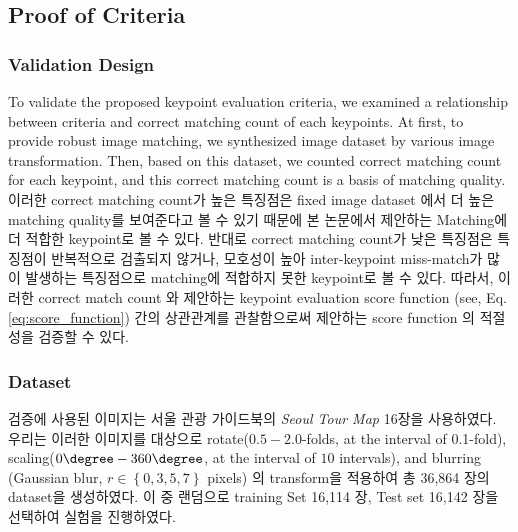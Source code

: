 
\subsection{Proof of Criteria}
\subsubsection{Validation Design}
To validate the proposed keypoint evaluation criteria, we examined a relationship between criteria and correct matching count of each keypoints. At first, to provide robust image matching, we synthesized image dataset by various image transformation. Then, based on this dataset, we counted correct matching count for each keypoint, and this correct matching count is a basis of matching quality. 이러한 correct matching count가 높은 특징점은 fixed image dataset 에서 더 높은 matching quality를 보여준다고 볼 수 있기 때문에 본 논문에서 제안하는 Matching에 더 적합한 keypoint로 볼 수 있다. 반대로 correct matching count가 낮은 특징점은 특징점이 반복적으로 검출되지 않거나, 모호성이 높아 inter-keypoint miss-match가 많이 발생하는 특징점으로 matching에 적합하지 못한 keypoint로 볼 수 있다. 따라서, 이러한 correct match count 와 제안하는 keypoint evaluation score function (see, Eq. \ref{eq:score_function}) 간의 상관관계를 관찰함으로써 제안하는 score function 의 적절성을 검증할 수 있다.


\subsubsection{Dataset}
검증에 사용된 이미지는 서울 관광 가이드북\cite{_seoul_2014}의 \textit{Seoul Tour Map} 16장을 사용하였다. 우리는 이러한 이미지를 대상으로 rotate($0.5-2.0$-folds, at the interval of 0.1-fold), scaling($0\degree-360\degree$, at the interval of $10$ intervals), and blurring (Gaussian blur, $r \in \left \{ 0, 3, 5, 7 \right \}$ pixels) 의 transform을 적용하여 총 36,864 장의 dataset을 생성하였다. 이 중 랜덤으로 training Set 16,114 장, Test set 16,142 장을 선택하여 실험을 진행하였다. 

